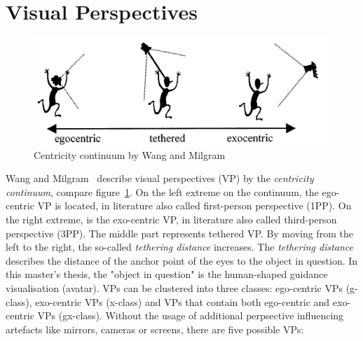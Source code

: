 \section{Visual Perspectives}
\label{section:visual_perspectives}
\begin{figure}[H]
	\centering
	\includegraphics[width=\textwidth]{figures/ego_exo_continuum.PNG}
	\caption[Centricity continuum]{Centricity continuum by Wang and Milgram~\cite{centricitycontinuum}}
	\label{fig:ego-exo-continuum}
\end{figure}
Wang and Milgram~\cite{centricitycontinuum} describe visual perspectives (VP) by the \textit{centricity continuum}, compare figure~\ref{fig:ego-exo-continuum}. On the left extreme on the continuum, the ego-centric VP is located, in literature also called first-person perspective (1PP). On the right extreme, is the exo-centric VP, in literature also called third-person perspective (3PP). The middle part represents tethered VP. By moving from the left to the right, the so-called \textit{tethering distance} increases. The \textit{tethering distance} describes the distance of the anchor point of the eyes to the object in question. In this master's thesis, the "object in question" is the human-shaped guidance visualisation (avatar). VPs can be clustered into three classes: ego-centric VPs (g-class), exo-centric VPs (x-class) and VPs that contain both ego-centric and exo-centric VPs (gx-class). Without the usage of additional perpsective influencing artefacts like mirrors, cameras or screens, there are five possible VPs:
